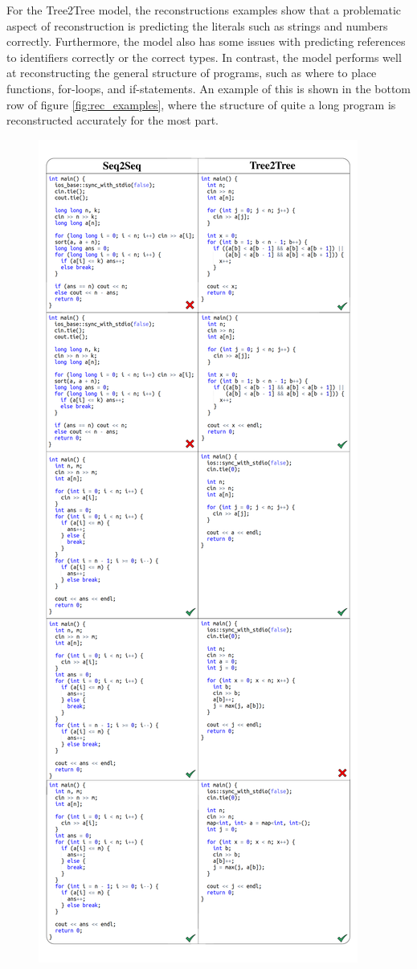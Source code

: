 For the Tree2Tree model, the reconstructions examples show that a problematic aspect of reconstruction is predicting the literals such as strings and numbers correctly. Furthermore, the model also has some issues with predicting references to identifiers correctly or the correct types. In contrast, the model performs well at reconstructing the general structure of programs, such as where to place functions, for-loops, and if-statements. An example of this is shown in the bottom row of figure \ref{fig:rec_examples}, where the structure of quite a long program is reconstructed accurately for the most part. 

\begin{figure}
    \centering
    \includegraphics[width=\textwidth,height=\textheight,keepaspectratio]{images/Interpolations.pdf}

\end{figure}

